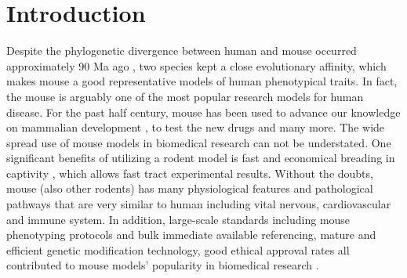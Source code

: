 \section{Introduction}

Despite the phylogenetic divergence between human and mouse occurred approximately 90 Ma ago \cite{Hedges_2006}, two species kept a close evolutionary affinity, which makes mouse a good representative models of human phenotypical traits. In fact, the mouse is arguably one of the most popular research models for human disease. For the past half century, mouse has been used to advance our knowledge on mammalian development \cite{Ueda_2006, Cheon_2011}, to test the new drugs \cite{Van_Dam_2011} and many more. The wide spread use of mouse models in biomedical research can not be understated. \cite{MORSEIII_2007} One significant benefits of utilizing a rodent model is fast and economical breading in captivity \cite{Rosenthal_2007}, which allows fast tract experimental results. \cite{Vandamme_2014} Without the doubts, mouse (also other rodents) has many physiological features and pathological pathways that are very similar to human including vital nervous, cardiovascular and immune system. \cite{MORSEIII_2007,Rosenthal_2007} In addition, large-scale standards including mouse phenotyping protocols and bulk immediate available referencing, mature and efficient genetic modification technology, good ethical approval rates all contributed to mouse models' popularity in biomedical research \cite{26214591}. 
\\

